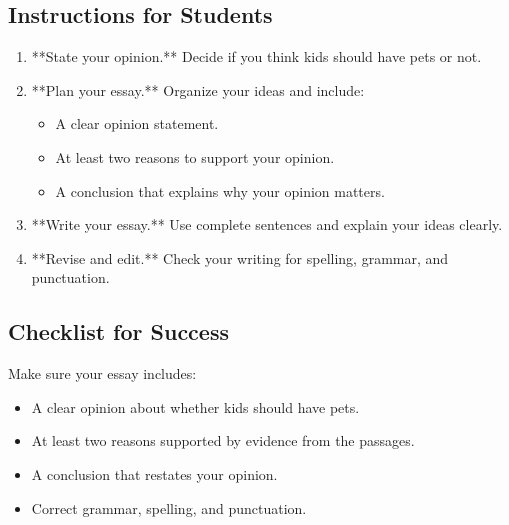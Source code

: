 \documentclass[12pt]{article}
\begin{document}
\subsection*{Instructions for Students}

\begin{enumerate}
    \item **State your opinion.** Decide if you think kids should have pets or not.
    \item **Plan your essay.** Organize your ideas and include:
    \begin{itemize}
        \item A clear opinion statement.
        \item At least two reasons to support your opinion.
        \item A conclusion that explains why your opinion matters.
    \end{itemize}
    \item **Write your essay.** Use complete sentences and explain your ideas clearly.
    \item **Revise and edit.** Check your writing for spelling, grammar, and punctuation.
\end{enumerate}

\subsection*{Checklist for Success}

Make sure your essay includes:
\begin{itemize}
    \item A clear opinion about whether kids should have pets.
    \item At least two reasons supported by evidence from the passages.
    \item A conclusion that restates your opinion.
    \item Correct grammar, spelling, and punctuation.
\end{itemize}
\end{document}
